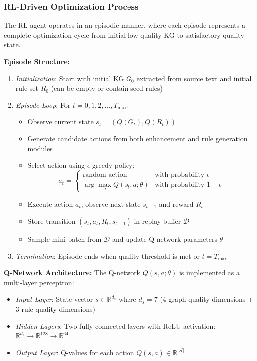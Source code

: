\documentclass[runningheads]{llncs}
\begin{document}
\subsubsection{RL-Driven Optimization Process}

The RL agent operates in an episodic manner, where each episode represents a complete optimization cycle from initial low-quality KG to satisfactory quality state.

\textbf{Episode Structure:}
\begin{enumerate}
    \item \textit{Initialization}: Start with initial KG $G_0$ extracted from source text and initial rule set $R_0$ (can be empty or contain seed rules)
    \item \textit{Episode Loop}: For $t = 0, 1, 2, ..., T_{\text{max}}$:
    \begin{itemize}
        \item Observe current state $s_t = (Q(G_t), Q(R_t))$
        \item Generate candidate actions from both enhancement and rule generation modules
        \item Select action using $\epsilon$-greedy policy:
        \begin{equation}
        a_t = \begin{cases}
        \text{random action} & \text{with probability } \epsilon \\
        \arg\max_{a} Q(s_t, a; \theta) & \text{with probability } 1-\epsilon
        \end{cases}
        \end{equation}
        \item Execute action $a_t$, observe next state $s_{t+1}$ and reward $R_t$
        \item Store transition $(s_t, a_t, R_t, s_{t+1})$ in replay buffer $\mathcal{D}$
        \item Sample mini-batch from $\mathcal{D}$ and update Q-network parameters $\theta$
    \end{itemize}
    \item \textit{Termination}: Episode ends when quality threshold is met or $t = T_{\text{max}}$
\end{enumerate}

\textbf{Q-Network Architecture:}
The Q-network $Q(s, a; \theta)$ is implemented as a multi-layer perceptron:
\begin{itemize}
    \item \textit{Input Layer}: State vector $s \in \mathbb{R}^{d_s}$ where $d_s = 7$ (4 graph quality dimensions + 3 rule quality dimensions)
    \item \textit{Hidden Layers}: Two fully-connected layers with ReLU activation: $\mathbb{R}^{d_s} \rightarrow \mathbb{R}^{128} \rightarrow \mathbb{R}^{64}$
    \item \textit{Output Layer}: Q-values for each action $Q(s, a) \in \mathbb{R}^{|\mathcal{A}|}$
\end{itemize}
\end{document}
